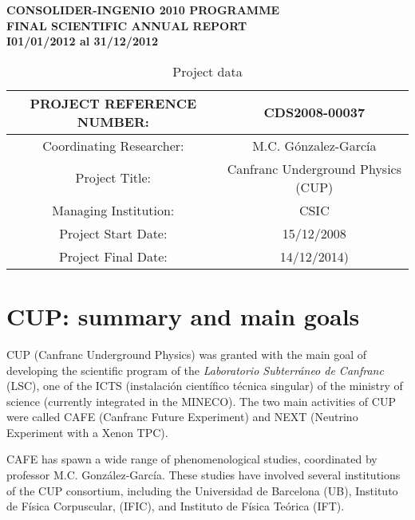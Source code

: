 \documentclass[a4paper,11pt,oneside]{article}
\begin{document}


\begin{center}
{\LARGE \bf \textsf{CONSOLIDER-INGENIO 2010 PROGRAMME }} \\ \vspace{0.5cm}
{\Large \bf \textsf{FINAL SCIENTIFIC ANNUAL REPORT}} \\ \vspace{0.5cm}
{\Large \bf \textsf{I01/01/2012 al 31/12/2012 }} \\ \vspace{2cm}
\end{center}


\begin{table}[htp!]
\begin{center}
\begin{tabular}{|c|c|}
\hline
PROJECT REFERENCE NUMBER: & CDS2008-00037\\
\hline
Coordinating Researcher:  & M.C. G\'onzalez-Garc\'ia \\
Project Title: & Canfranc Underground Physics (CUP) \\
Managing Institution:  & CSIC \\
Project Start Date:  & 15/12/2008\\
Project Final Date: &  14/12/2014)\\
\hline\hline
\end{tabular}
\end{center}
\caption{Project data}
\label{default}
\end{table}%

\newpage

\section{\bf \textsf{CUP: summary and main goals }}

CUP (Canfranc Underground Physics) was granted with the main goal of developing the scientific program of the
 \emph{Laboratorio Subterr\'aneo de Canfranc} (LSC), one of the ICTS (instalaci\'on cient\'ifico t\'ecnica singular) of the ministry of science (currently integrated in the MINECO). The two main activities of CUP were called
 CAFE (Canfranc Future Experiment) and NEXT (Neutrino Experiment with a Xenon TPC).

CAFE has spawn a wide range of phenomenological studies, coordinated by professor 
M.C. Gonz\'alez-Garc\'ia. These studies have involved several institutions of the CUP consortium, including the Universidad de Barcelona (UB), Instituto de F\'isica Corpuscular, (IFIC), and Instituto de F\'isica Te\'orica (IFT). 
\end{document}
